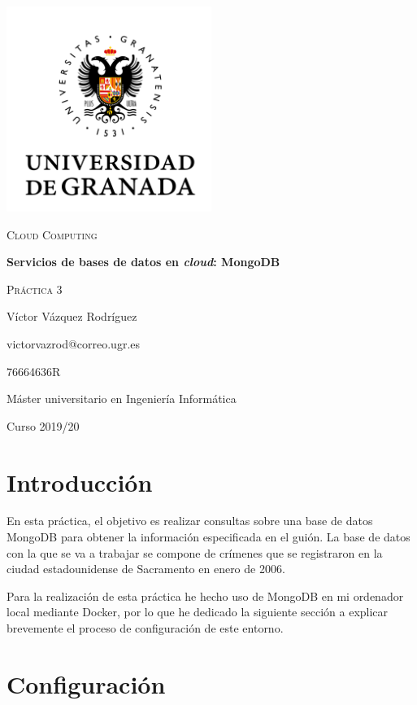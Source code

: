 \documentclass{article}
\begin{document}
\begin{titlepage}
    \centering
    \includegraphics[width=0.5\textwidth]{images/logo-ugr.png}\par
    \vspace{1cm}
    {\Large\scshape Cloud Computing \par}
    {\huge\bfseries Servicios de bases de datos en \textit{cloud}: MongoDB \par}
    \vspace{0.2cm}
    {\scshape Práctica 3 \par}
    \vfill
    {\large Víctor Vázquez Rodríguez  \par}
    {victorvazrod@correo.ugr.es \par}
    {76664636R \par}
    \vfill
    {\large Máster universitario en Ingeniería Informática \par}
    \vspace{0.2cm}
    {Curso 2019/20 \par}
\end{titlepage}

\section{Introducción}

En esta práctica, el objetivo es realizar consultas sobre una base de datos
MongoDB para obtener la información especificada en el guión. La base de datos
con la que se va a trabajar se compone de crímenes que se registraron en la
ciudad estadounidense de Sacramento en enero de 2006.

Para la realización de esta práctica he hecho uso de MongoDB en mi ordenador
local mediante Docker, por lo que he dedicado la siguiente sección a explicar
brevemente el proceso de configuración de este entorno.

\section{Configuración}
\end{document}
